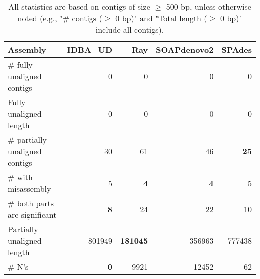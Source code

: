 \documentclass[12pt,a4paper]{article}
\begin{document}
\begin{table}[ht]
\begin{center}
\caption{All statistics are based on contigs of size $\geq$ 500 bp, unless otherwise noted (e.g., "\# contigs ($\geq$ 0 bp)" and "Total length ($\geq$ 0 bp)" include all contigs).}
\begin{tabular}{|l*{4}{|r}|}
\hline
Assembly & IDBA\_UD & Ray & SOAPdenovo2 & SPAdes \\ \hline
\# fully unaligned contigs & 0 & 0 & 0 & 0 \\ \hline
Fully unaligned length & 0 & 0 & 0 & 0 \\ \hline
\# partially unaligned contigs & 30 & 61 & 46 & {\bf 25} \\ \hline
\hspace{5mm}\# with misassembly & 5 & {\bf 4} & {\bf 4} & 5 \\ \hline
\hspace{5mm}\# both parts are significant & {\bf 8} & 24 & 22 & 10 \\ \hline
Partially unaligned length & 801949 & {\bf 181045} & 356963 & 777438 \\ \hline
\# N's & {\bf 0} & 9921 & 12452 & 62 \\ \hline
\end{tabular}
\end{center}
\end{table}
\end{document}
